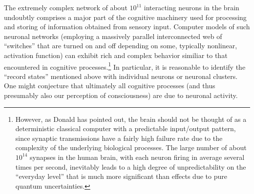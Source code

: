 \documentclass[12pt,aps,floatfix,amsmath,amssymb,showpacs,nofootinbib]{revtex4-2}
\begin{document}
The extremely complex network of about $10^{11}$ interacting neurons
in the brain undoubtly comprises a major part of the cognitive
machinery used for processing and storing of information obtained from
sensory input.  Computer models of such neuronal networks (employing a
massively parallel interconnected web of ``switches'' that are turned
on and off depending on some, typically nonlinear, activation
function) can exhibit rich and complex behavior similiar to that
encountered in cognitive processes.\footnote{However, as Donald
  \cite{Donald:2002:um} has pointed out, the brain should not be
  thought of as a deterministic classical computer with a predictable
  input/output pattern, since synaptic transmissions have a fairly
  high failure rate due to the complexity of the underlying biological
  processes.  The large number of about $10^{14}$ synapses in the
  human brain, with each neuron firing in average several times per
  second, inevitably leads to a high degree of unpredictability on the
  ``everyday level'' that is much more significant than effects due to
  pure quantum uncertainties.  } In particular, it is reasonable to
identify the ``record states'' mentioned above with individual neurons
or neuronal clusters.  One might conjecture that ultimately all
cognitive processes (and thus presumably also our perception of
consciousness) are due to neuronal activity.
\end{document}
